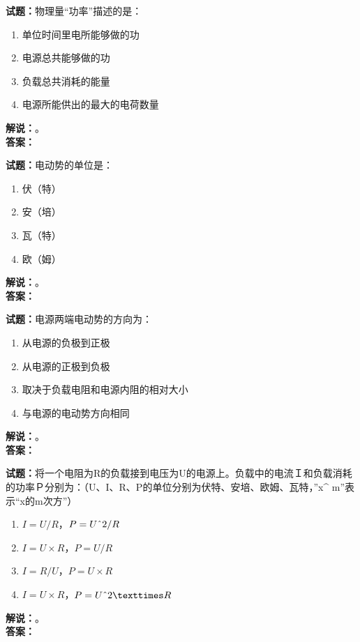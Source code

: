 \documentclass{ctexbook}
\begin{document}
\bigskip




\noindent\textbf{试题：}物理量“功率”描述的是：
\begin{enumerate}[leftmargin=3em]
\item 单位时间里电所能够做的功
\item 电源总共能够做的功
\item 负载总共消耗的能量
\item 电源所能供出的最大的电荷数量
\end{enumerate}
\noindent\textbf{解说：}\textbf{}。\\\noindent\textbf{答案：}

\bigskip




\noindent\textbf{试题：}电动势的单位是：
\begin{enumerate}[leftmargin=3em]
\item 伏（特）
\item 安（培）
\item 瓦（特）
\item 欧（姆）
\end{enumerate}
\noindent\textbf{解说：}\textbf{}。\\\noindent\textbf{答案：}

\bigskip




\noindent\textbf{试题：}电源两端电动势的方向为：
\begin{enumerate}[leftmargin=3em]
\item 从电源的负极到正极
\item 从电源的正极到负极
\item 取决于负载电阻和电源内阻的相对大小
\item 与电源的电动势方向相同
\end{enumerate}
\noindent\textbf{解说：}\textbf{}。\\\noindent\textbf{答案：}

\bigskip




\noindent\textbf{试题：}将一个电阻为R的负载接到电压为U的电源上。负载中的电流Ｉ和负载消耗的功率Ｐ分别为：（U、I、R、P的单位分别为伏特、安培、欧姆、瓦特，”x\string^ m”表示“x的m次方”）
\begin{enumerate}[leftmargin=3em]
\item \(I = U/R\)，\(P = U\string^ 2/R\)
\item \(I = U\times R\)，\(P =U/R\)
\item \(I = R/U\)，\(P = U\times R\)
\item \(I = U\times R\)，\(P = U\string^ 2×R\)
\end{enumerate}
\noindent\textbf{解说：}\textbf{}。\\\noindent\textbf{答案：}
\end{document}
